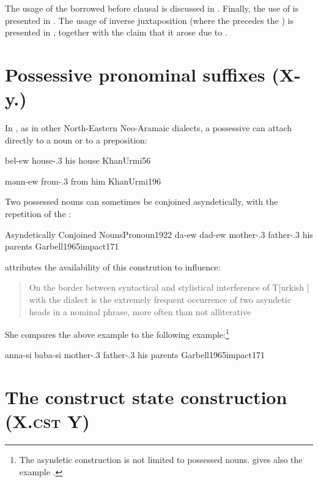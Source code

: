 The usage of the borrowed \rel* {} before clausal \secns is discussed in . Finally, the  use of  is presented in . The usage of {inverse juxtaposition} (where the \secn precedes the \prim) is presented in , together with the claim that it arose due to .




\section{Possessive pronominal suffixes (X-y.\poss)} \label{ss:JUrmi_Poss_Pro}

In \JUrm, as in other North-Eastern Neo-Aramaic dialects, a possessive  can attach directly to a noun or to a preposition:

{bel-ew}
{house-\poss.3\masc}
{his house}
{KhanUrmi}{56}

{mənn-ew}
{from-\poss.3\masc}
{from him}
{KhanUrmi}{196} 

Two possessed nouns can sometimes be conjoined asyndetically, with the repetition of the :

\acex
{Asyndetically Conjoined Nouns}{Pronoun}{1922}
{da-ew dad-ew}
{mother-\poss.3\masc{} father-\poss.3\masc}
{his parents}
{Garbell1965impact}{171}

\citet[171, \S 2.32.11]{Garbell1965impact} attributes the availability of this constrution to \Azr influence: \blockquote{On the border between syntactical and stylistical interference of T[urkish ] with the dialect is the extremely frequent occurrence of two asyndetic heads in a nominal phrase, more often than not alliterative}. She compares the above example to the following \Azr example:\footnote{The asyndetic construction is not limited to possessed nouns. \citet[171]{Garbell1965impact} gives also the \Azr example .}

{anna-si baba-si}
{mother-\poss.3\sg{} father-\poss.3\sg}
{his parents}
{Garbell1965impact}{171}






\section{The construct state construction (X.\textsc{cst} Y)} \label{ss:JUrmi_CST}
